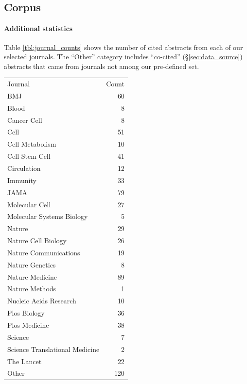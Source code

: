 \documentclass[11pt,a4paper]{article}
\newcommand{\thinmid}{\arrayrulecolor{black!30}\midrule}
\newcommand{\thickmid}{\arrayrulecolor{black}\midrule}
\begin{document}
\subsection{Corpus} \label{sec:data_source_appendix}

\paragraph{Additional statistics} Table \ref{tbl:journal_counts} shows the number of cited abstracts from each of our selected journals. The ``Other'' category includes ``co-cited'' (\S\ref{sec:data_source}) abstracts that came from journals not among our pre-defined set.

\begin{table}[t]
  \centering

  \begin{tabular}{l r}
  \toprule
  Journal & Count \\
  \thickmid
  BMJ                            &     60 \\
Blood                          &      8 \\
Cancer Cell                    &      8 \\
Cell                           &     51 \\
Cell Metabolism                &     10 \\
Cell Stem Cell                 &     41 \\
Circulation                    &     12 \\
Immunity                       &     33 \\
JAMA                           &     79 \\
Molecular Cell                 &     27 \\
Molecular Systems Biology      &      5 \\
Nature                         &     29 \\
Nature Cell Biology            &     26 \\
Nature Communications          &     19 \\
Nature Genetics                &      8 \\
Nature Medicine                &     89 \\
Nature Methods                 &      1 \\
Nucleic Acids Research         &     10 \\
Plos Biology                   &     36 \\
Plos Medicine                  &     38 \\
Science                        &      7 \\
Science Translational Medicine &      2 \\
The Lancet                     &     22 \\
\thinmid
Other                          &    120 \\


\end{tabular}
\end{table}
\end{document}
